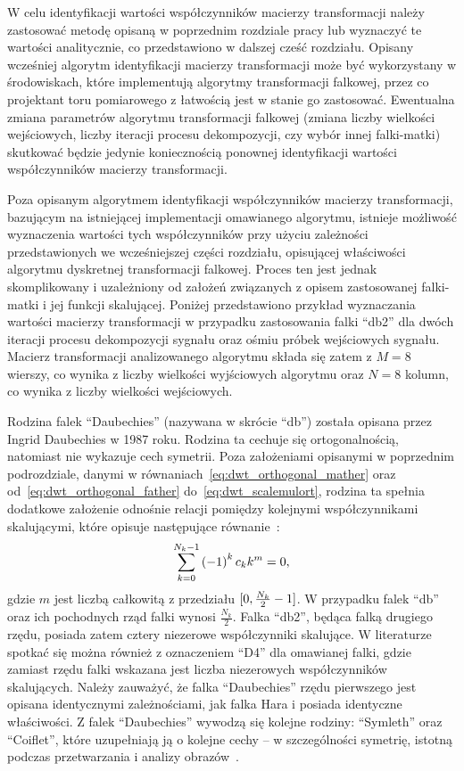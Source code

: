 W celu identyfikacji wartości współczynników macierzy transformacji należy zastosować metodę opisaną w poprzednim rozdziale pracy lub wyznaczyć te wartości analitycznie, co przedstawiono w dalszej cześć rozdziału. Opisany wcześniej algorytm identyfikacji macierzy transformacji może być wykorzystany w środowiskach, które implementują algorytmy transformacji falkowej, przez co projektant toru pomiarowego z łatwością jest w stanie go zastosować. Ewentualna zmiana parametrów algorytmu transformacji falkowej (zmiana liczby wielkości wejściowych, liczby iteracji procesu dekompozycji, czy wybór innej falki-matki) skutkować będzie jedynie koniecznością ponownej identyfikacji wartości współczynników macierzy transformacji.

Poza opisanym algorytmem identyfikacji współczynników macierzy transformacji, bazującym na istniejącej implementacji omawianego algorytmu, istnieje możliwość wyznaczenia wartości tych współczynników przy użyciu zależności przedstawionych we wcześniejszej części rozdziału, opisującej właściwości algorytmu dyskretnej transformacji falkowej. Proces ten jest jednak skomplikowany i uzależniony od założeń związanych z opisem zastosowanej falki-matki i jej funkcji skalującej. Poniżej przedstawiono przykład wyznaczania wartości macierzy transformacji w przypadku zastosowania falki \enquote{db2} dla dwóch iteracji procesu dekompozycji sygnału oraz ośmiu próbek wejściowych sygnału. Macierz transformacji analizowanego algorytmu składa się zatem z $M = 8$ wierszy, co wynika z liczby wielkości wyjściowych algorytmu oraz $N = 8$ kolumn, co wynika z liczby wielkości wejściowych.

Rodzina falek \enquote{Daubechies} (nazywana w skrócie \enquote{db}) została opisana przez Ingrid Daubechies w 1987 roku. Rodzina ta cechuje się ortogonalnością, natomiast nie wykazuje cech symetrii. Poza założeniami opisanymi w poprzednim podrozdziale, danymi w równaniach~\eqref{eq:dwt_orthogonal_mather} oraz od~\eqref{eq:dwt_orthogonal_father} do~\eqref{eq:dwt_scalemulort}, rodzina ta spełnia dodatkowe założenie odnośnie relacji pomiędzy kolejnymi współczynnikami skalującymi, które opisuje następujące równanie~\cite{vonesch_dbbasics}:
\begin{equation}
\sum _{k=0} ^{N_k-1} \left(-1\right)^{k} c_{k} k^{m} = 0 \label{eq:db_musthave},
\end{equation}
gdzie $m$ jest liczbą całkowitą z przedziału $\interval{0}{\frac{N_{k}}{2}-1}$. W przypadku falek \enquote{db} oraz ich pochodnych rząd falki wynosi $\frac{N_{k}}{2}$. Falka \enquote{db2}, będąca falką drugiego rzędu, posiada zatem cztery niezerowe współczynniki skalujące. W literaturze spotkać się można również z oznaczeniem \enquote{D4} dla omawianej falki, gdzie zamiast rzędu falki wskazana jest liczba niezerowych współczynników skalujących. Należy zauważyć, że falka \enquote{Daubechies} rzędu pierwszego jest opisana identycznymi zależnościami, jak falka Hara i posiada identyczne właściwości. Z falek \enquote{Daubechies} wywodzą się kolejne rodziny: \enquote{Symleth} oraz \enquote{Coiflet}, które uzupełniają ją o kolejne cechy -- w szczególności symetrię, istotną podczas przetwarzania i analizy obrazów~\cite{wallen_handbook, akujuobi_applications}.

